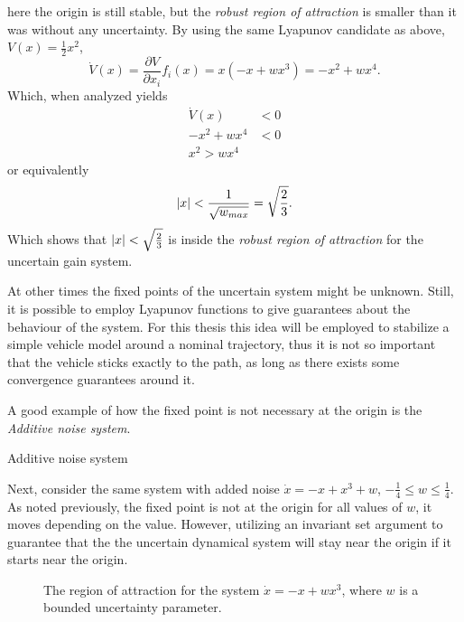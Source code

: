 here the origin is still stable, but the \textit{robust region of attraction} is
smaller than it was without any uncertainty. By using the same Lyapunov
candidate as above, \(V(x) = \frac{1}{2}x^2\),
\[
  \dot{V}(x) = \frac{\partial V}{\partial x_i} f_i(x) = x(-x + wx^3) = -x^2 +
  wx^4.
\]
Which, when analyzed yields
\begin{align*}
  \dot{V}(x) &< 0 \\
  -x^2 + wx^4 &< 0 \\
  x^2 > wx^4
\end{align*}
or equivalently
\[
  \lvert x\rvert < \frac{1}{\sqrt{w_{max}}} = \sqrt{\frac{2}{3}}.
\]
Which shows that \(\lvert x\rvert < \sqrt{\frac{2}{3}}\) is inside the \textit{robust
  region of attraction} for the uncertain gain system.

At other times the fixed points of the uncertain system might be unknown. Still,
it is possible to employ Lyapunov functions to give guarantees about the
behaviour of the system. For this thesis this idea will be employed to stabilize
a simple vehicle model around a nominal trajectory, thus it is not so important
that the vehicle sticks exactly to the path, as long as there exists some
convergence guarantees around it.

A good example of how the fixed point is not necessary at the origin is the
\textit{Additive noise system}.

\begin{example}{Additive noise system}

  Next, consider the same system with added noise \(\dot{x} = -x + x^3 + w\),
  \(-\frac{1}{4} \leq w \leq \frac{1}{4}\). As noted previously, the fixed point
  is not at the origin for all values of \(w\), it moves depending on the value.
  However, utilizing an invariant set argument to guarantee that the the
  uncertain dynamical system will stay near the origin if it starts near the
  origin.

  \begin{figure}
  \begin{centering}
    
  \end{centering}
  \caption{The region of attraction for the system \(\dot{x} = -x + wx^3\),
  where \(w\) is a bounded uncertainty parameter.}
  \end{figure}
\end{example}

